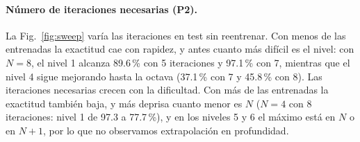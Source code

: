 \paragraph{Número de iteraciones necesarias (P2).}
La Fig.~\ref{fig:sweep} varía las iteraciones en test sin reentrenar. Con menos
de las entrenadas la exactitud cae con rapidez, y antes cuanto más difícil es el
nivel: con $N{=}8$, el nivel 1 alcanza 89.6\,\% con 5 iteraciones y 97.1\,\% con 7,
mientras que el nivel 4 sigue mejorando hasta la octava (37.1\,\% con 7 y
45.8\,\% con 8). Las iteraciones necesarias crecen con la dificultad. Con
más de las entrenadas la exactitud también baja, y más deprisa cuanto menor es
$N$ ($N{=}4$ con 8 iteraciones: nivel 1 de 97.3 a 77.7\,\%), y en los niveles 5 y 6 el máximo está en $N$ o en $N{+}1$, por
lo que no observamos extrapolación en profundidad.
